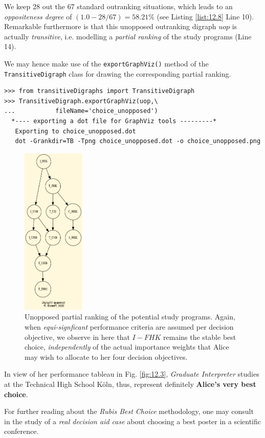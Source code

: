 We keep 28 out the 67 standard outranking situations, which leads to an \emph{oppositeness degree} of $(1.0 - 28/67) = 58.21\%$ (see Listing \ref{list:12.8} Line 10). Remarkable furthermore is that this unopposed outranking digraph $uop$ is actually \emph{transitive}, i.e. modelling a \emph{partial ranking} of the study programs (Line 14).

We may hence make use of the \texttt{exportGraphViz()} method of the\\ \texttt{TransitiveDigraph} class for drawing the corresponding partial ranking.

\begin{lstlisting}
>>> from transitiveDigraphs import TransitiveDigraph
>>> TransitiveDigraph.exportGraphViz(uop,\
...           fileName='choice_unopposed')
  *---- exporting a dot file for GraphViz tools ---------*
   Exporting to choice_unopposed.dot
   dot -Grankdir=TB -Tpng choice_unopposed.dot -o choice_unopposed.png
\end{lstlisting}
\begin{figure}[h]
\sidecaption
\includegraphics[width=3cm]{Figures/AliceChoice_unopposed.png}
\caption{Unopposed partial ranking of the potential study programs. Again, when \emph{equi-signficant} performance criteria are assumed per decision objective, we observe in here that $I-FHK$ remains the stable best choice, \emph{independently} of the actual importance weights that Alice may wish to allocate to her four decision objectives.}
\label{fig:12.7}       %
\end{figure}
\clearpage
In view of her performance tableau in Fig. \ref{fig:12.3}, \emph{Graduate Interpreter} studies at the Technical High School Köln, thus, represent definitely \textbf{Alice's very best choice}.

For further reading about the \emph{Rubis Best Choice} methodology, one may consult in \cite{BIS-2015} the study of a \emph{real decision aid case} about choosing a best poster in a scientific conference.
 
